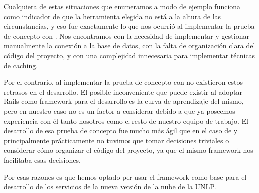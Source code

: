 Cualquiera de estas situaciones que enumeramos a modo de ejemplo funciona como indicador de que la herramienta elegida no está a la altura de las circunstancias, y eso fue exactamente lo que nos ocurrió al implementar la prueba de concepto con . Nos encontramos con la necesidad de implementar y gestionar manualmente la conexión a la base de datos, con la falta de organización clara del código del proyecto, y con una complejidad innecesaria para implementar técnicas de caching.

Por el contrario, al implementar la prueba de concepto con  no existieron estos retrasos en el desarrollo. El posible inconveniente que puede existir al adoptar Rails como framework para el desarrollo es la curva de aprendizaje del mismo, pero en nuestro caso no es un factor a considerar debido a que ya poseemos experiencia con él tanto nosotros como el resto de nuestro equipo de trabajo. El desarrollo de esa prueba de concepto fue mucho más ágil que en el caso de  y principalmente prácticamente no tuvimos que tomar decisiones triviales o considerar cómo organizar el código del proyecto, ya que el mismo framework nos facilitaba esas decisiones.

Por esas razones es que hemos optado por usar el framework  como base para el desarrollo de los servicios de la nueva versión de la nube de la UNLP.
